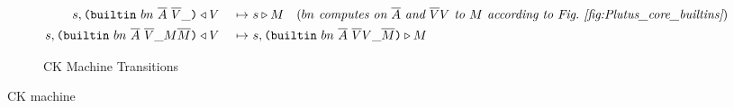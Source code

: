 \documentclass[../plutus-core-specification.tex]{subfiles}
\begin{document}
\begin{figure}[H]
\begin{subfigure}[c]{\linewidth}
\begin{minipage}{\linewidth}
\begin{alignat*}{2}
        s, \texttt{(} \texttt{builtin} ~ bn ~ \overline{A} ~ \overline{V} \_  \texttt{)}& \triangleleft V& ~\mapsto~ &s \triangleright M 
          \quad (\textit{$bn$ computes on $\overline{A}$ and $\overline{V}V$ to $M$ according to Fig.~\ref{fig:Plutus_core_builtins}})\\
        s, \texttt{(} \texttt{builtin} ~ bn ~ \overline{A} ~ \overline{V} \_ M \overline{M} \texttt{)}& \triangleleft V& ~\mapsto~ &s, \texttt{(} \texttt{builtin} ~ bn ~ \overline{A} ~ \overline{V} V \_ \overline{M} \texttt{)} \triangleright M\\
    \end{alignat*}
\end{minipage}
    \caption{CK Machine Transitions}
    \label{fig:Plutus_core_ck_machine}
\end{subfigure}
\label{fig:ck-machine}
\caption{CK machine}
\end{figure}
\end{document}
